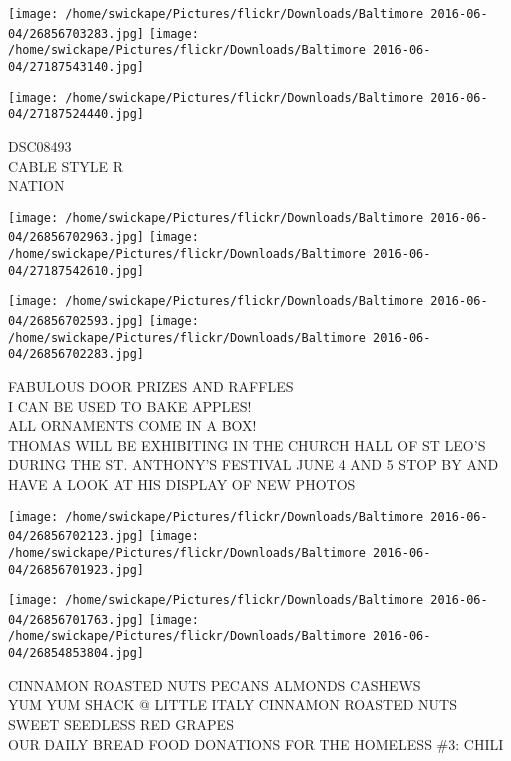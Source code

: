 \documentclass[10pt,letterpaper]{article}
\begin{document}
\texttt{[image: /home/swickape/Pictures/flickr/Downloads/Baltimore 2016-06-04/26856703283.jpg]}
\texttt{[image: /home/swickape/Pictures/flickr/Downloads/Baltimore 2016-06-04/27187543140.jpg]}

\vspace{0.25in}
\texttt{[image: /home/swickape/Pictures/flickr/Downloads/Baltimore 2016-06-04/27187524440.jpg]}

DSC08493\\
CABLE STYLE R\\
NATION\\
\pagebreak

\texttt{[image: /home/swickape/Pictures/flickr/Downloads/Baltimore 2016-06-04/26856702963.jpg]}
\texttt{[image: /home/swickape/Pictures/flickr/Downloads/Baltimore 2016-06-04/27187542610.jpg]}

\texttt{[image: /home/swickape/Pictures/flickr/Downloads/Baltimore 2016-06-04/26856702593.jpg]}
\texttt{[image: /home/swickape/Pictures/flickr/Downloads/Baltimore 2016-06-04/26856702283.jpg]}

FABULOUS DOOR PRIZES AND RAFFLES\\
I CAN BE USED TO BAKE APPLES!\\
ALL ORNAMENTS COME IN A BOX!\\
THOMAS WILL BE EXHIBITING IN THE CHURCH HALL OF ST LEO'S DURING THE ST. ANTHONY'S FESTIVAL JUNE 4 AND 5 STOP BY AND HAVE A LOOK AT HIS DISPLAY OF NEW PHOTOS\\
\pagebreak

\texttt{[image: /home/swickape/Pictures/flickr/Downloads/Baltimore 2016-06-04/26856702123.jpg]}
\texttt{[image: /home/swickape/Pictures/flickr/Downloads/Baltimore 2016-06-04/26856701923.jpg]}

\texttt{[image: /home/swickape/Pictures/flickr/Downloads/Baltimore 2016-06-04/26856701763.jpg]}
\texttt{[image: /home/swickape/Pictures/flickr/Downloads/Baltimore 2016-06-04/26854853804.jpg]}

CINNAMON ROASTED NUTS PECANS ALMONDS CASHEWS\\
YUM YUM SHACK @ LITTLE ITALY CINNAMON ROASTED NUTS\\
SWEET SEEDLESS RED GRAPES\\
OUR DAILY BREAD FOOD DONATIONS FOR THE HOMELESS \#3: CHILI\\
\pagebreak
\end{document}
